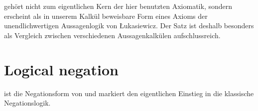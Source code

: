 \documentclass[main.tex]{subfiles}
\begin{document}
\begin{tabproof}
\end{tabproof}
\begin{remark}
 gehört nicht zum eigentlichen Kern der hier benutzten Axiomatik, sondern erscheint als in unserem Kalkül beweisbare Form eines Axioms der unendlichwertigen Aussagenlogik von Łukasiewicz. Der Satz ist deshalb besonders als Vergleich zwischen verschiedenen Aussagenkalkülen aufschlussreich.
\end{remark}

\begin{tabproof}
\end{tabproof}

\section{Logical negation}


\begin{tabproof}
\end{tabproof}
\begin{remark}
 ist die Negationsform von  und markiert den eigentlichen Einstieg in die klassische Negationslogik.
\end{remark}
\end{document}

